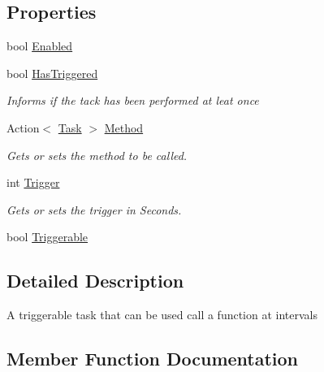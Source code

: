 \subsection*{Properties}
\begin{DoxyCompactItemize}
\item 
bool \hyperlink{classOTA_1_1Misc_1_1Task_a558f5c44426d0eb7abb82a65e8892d9a}{Enabled}
\item 
bool \hyperlink{classOTA_1_1Misc_1_1Task_a5a196897933429df04c9726ecf7fd14f}{Has\+Triggered}
\begin{DoxyCompactList}\small\item\em Informs if the tack has been performed at leat once \end{DoxyCompactList}\item 
Action$<$ \hyperlink{classOTA_1_1Misc_1_1Task}{Task} $>$ \hyperlink{classOTA_1_1Misc_1_1Task_a53b4da75fbd8d468e2ab275e5487e997}{Method}
\begin{DoxyCompactList}\small\item\em Gets or sets the method to be called. \end{DoxyCompactList}\item 
int \hyperlink{classOTA_1_1Misc_1_1Task_af920af1428f98e67fa8ee94e39cc691e}{Trigger}
\begin{DoxyCompactList}\small\item\em Gets or sets the trigger in Seconds. \end{DoxyCompactList}\item 
bool \hyperlink{classOTA_1_1Misc_1_1Task_ac36eb355f2165ad75b4d8f18dc5ee7f8}{Triggerable}
\end{DoxyCompactItemize}


\subsection{Detailed Description}
A triggerable task that can be used call a function at intervals 



\subsection{Member Function Documentation}
\hypertarget{classOTA_1_1Misc_1_1Task_a0ae96a321c0a4fe97d1ae8a159ebbed5}{}
